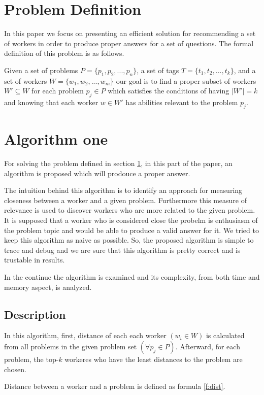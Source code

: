 \documentclass{template}
\begin{document}
\section{Problem Definition}
\label{sec:prblm-def}
In this paper we focus on presenting an efficient solution for recommending
a set of workers in order to produce proper answers for a set of questions.
The formal definition of this problem is as follows.

Given a set of problems \(P = \{ p_1, p_2, ..., p_n \} \), a set of tags
\(T = \{ t_1, t_2, ..., t_k\} \),
and a set of workers \(W = \{w_1, w_2, ..., w_m \} \) our goal is to 
find a proper subset of workers \(W'  \subseteq W\) for each
problem \( p_j \in P \) which satisfies the conditions of having \(|W'| = k \) and knowing that 
each worker \(w \in W'\) has abilities relevant to the problem \(p_j\).

\section{Algorithm one}
\label{sec:algo-one}
For solving the problem defined in section \ref{sec:prblm-def}, in this part of the paper,
an algorithm is proposed which will prodouce a proper answer. 

The intuition behind this algorithm is to identify an approach for measuring closeness between 
a worker and a given problem. Furthermore this measure of relevance is used to discover workers
who are more related to the given problem. It is supposed that a worker who is considered close
the probelm is enthusiasm of the problem topic and would be able to produce a valid answer for it.
We tried to keep this algorithm as naive as possible. So, the proposed algorithm is simple to trace 
and debug and we are sure that this algorithm is pretty correct and is trustable in results. 

In the continue the algorithm is
examined and its complexity, from both time and memory aspect, is analyzed.

\subsection{Description}
In this algorithm, first, distance of each each worker \((w_i \in W)\) is calculated
from all problems in the given problem set \((\forall p_j \in P)\). Afterward, for each
problem, the top-\(k\) workeres who have the least distances to the problem are chosen. 

Distance between a worker and a problem is defined as formula \ref{f:dist}.
\end{document}

